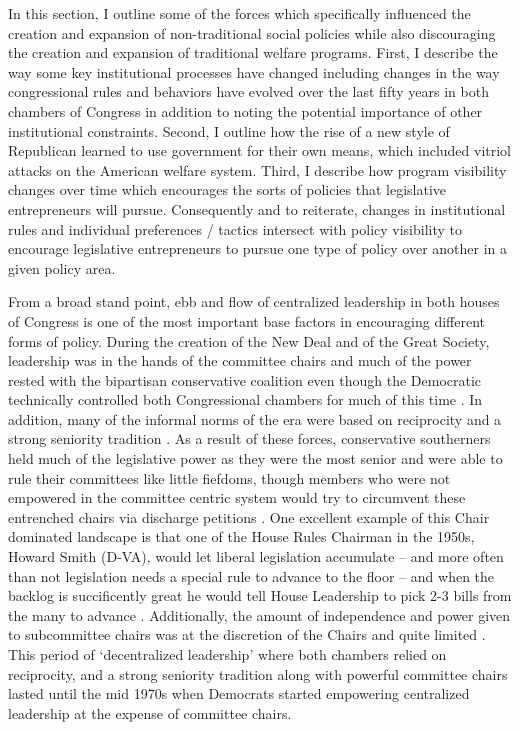 \documentclass[12pt]{article}
\begin{document}
In this section, I outline some of the forces which specifically influenced the creation and expansion of non-traditional social policies while also discouraging the creation and expansion of traditional welfare programs. First, I describe the way some key institutional processes have changed including changes in the way congressional rules and behaviors have evolved over the last fifty years in both chambers of Congress in addition to noting the potential importance of other institutional constraints. Second, I outline how the rise of a new style of Republican learned to use government for their own means, which included vitriol attacks on the American welfare system. Third, I describe how program visibility changes over time which encourages the sorts of policies that legislative entrepreneurs will pursue. Consequently and to reiterate, changes in institutional rules and individual preferences / tactics intersect with policy visibility to encourage legislative entrepreneurs to pursue one type of policy over another in a given policy area.

From a broad stand point, ebb and flow of centralized leadership in both houses of Congress is one of the most important base factors in encouraging different forms of policy. During the creation of the New Deal and of the Great Society, leadership was in the hands of the committee chairs and much of the power rested with the bipartisan conservative coalition even though the Democratic technically controlled both Congressional chambers for much of this time \citep{shepsle1989, polsby2004}. In addition, many of the informal norms of the era were based on reciprocity and a strong seniority tradition \citep{matthews1960, asher1973}. As a result of these forces, conservative southerners held much of the legislative power as they were the most senior and were able to rule their committees like little fiefdoms, though members who were not empowered in the committee centric system would try to circumvent these entrenched chairs via discharge petitions \citep{pearson2009}. One excellent example of this Chair dominated landscape is that one of the House Rules Chairman in the 1950s, Howard Smith (D-VA), would let liberal legislation accumulate -- and more often than not legislation needs a special rule to advance to the floor -- and when the backlog is succificently great he would tell House Leadership to pick 2-3 bills from the many to advance \cite[pg. 14]{polsby2004}. Additionally, the amount of independence and power given to subcommittee chairs was at the discretion of the Chairs and quite limited \citep{rohde1974}. This period of `decentralized leadership' where both chambers relied on reciprocity, and a strong seniority tradition along with powerful committee chairs lasted until the mid 1970s when Democrats started empowering centralized leadership at the expense of committee chairs.
\end{document}
